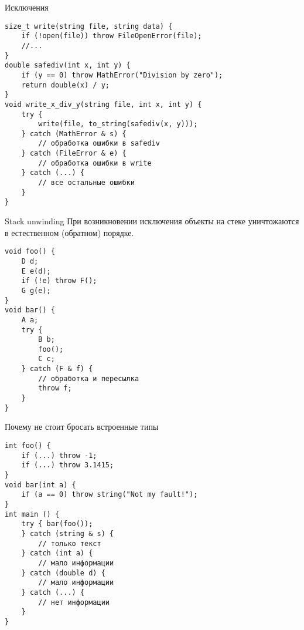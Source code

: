 \documentclass{beamer}
\begin{document}
\begin{frame}[fragile]{Исключения}






\begin{lstlisting}
size_t write(string file, string data) {
    if (!open(file)) throw FileOpenError(file);
    //...
}
double safediv(int x, int y) {
    if (y == 0) throw MathError("Division by zero");
    return double(x) / y;
}
void write_x_div_y(string file, int x, int y) {
    try { 
        write(file, to_string(safediv(x, y)));
    } catch (MathError & s) { 
        // обработка ошибки в safediv
    } catch (FileError & e) { 
        // обработка ошибки в write
    } catch (...) { 
        // все остальные ошибки
    }
}
\end{lstlisting}
\end{frame}

\begin{frame}[fragile]{Stack unwinding}
При возникновении исключения объекты на стеке
уничтожаются в естественном (обратном) порядке.
\begin{lstlisting}
void foo() {
    D d;
    E e(d);
    if (!e) throw F();
    G g(e);
}
void bar() {
    A a;
    try {
        B b;
        foo();
        C c;
    } catch (F & f) {
        // обработка и пересылка
        throw f;
    }
}
\end{lstlisting}
\end{frame}

\begin{frame}[fragile]{Почему не стоит бросать встроенные типы}
\begin{lstlisting}
int foo() {
    if (...) throw -1;
    if (...) throw 3.1415;
}
void bar(int a) {
    if (a == 0) throw string("Not my fault!");
}
int main () {
    try { bar(foo());
    } catch (string & s) {
        // только текст
    } catch (int a) { 
        // мало информации
    } catch (double d) { 
        // мало информации
    } catch (...) { 
        // нет информации 
    }
}
\end{lstlisting}
\end{frame}
\end{document}
